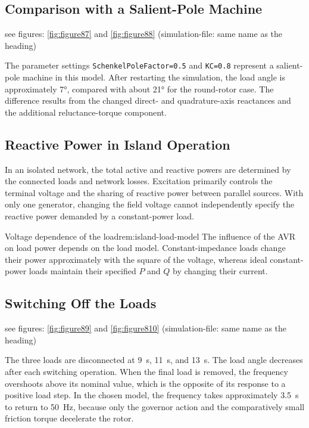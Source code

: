 \subsection{Comparison with a Salient-Pole Machine} see figures: \ref{fig:figure87} and \ref{fig:figure88}  (simulation-file: same name as the heading)

The parameter settings \texttt{SchenkelPoleFactor=0.5} and \texttt{KC=0.8}
represent a salient-pole machine in this model. After restarting the
simulation, the load angle is approximately \ang{7}, compared with about
\ang{21} for the round-rotor case. The difference results from the changed
direct- and quadrature-axis reactances and the additional reluctance-torque
component.



\subsection{Reactive Power in Island Operation} 

In an isolated network, the total active and reactive powers are determined by
the connected loads and network losses. Excitation primarily controls the
terminal voltage and the sharing of reactive power between parallel sources.
With only one generator, changing the field voltage cannot independently
specify the reactive power demanded by a constant-power load.

\begin{remark}{Voltage dependence of the load}{rem:island-load-model}
The influence of the AVR on load power depends on the load model. Constant-impedance loads change their power approximately with the square of the
voltage, whereas ideal constant-power loads maintain their specified $P$ and
$Q$ by changing their current.
\end{remark}

\subsection{Switching Off the Loads} see figures: \ref{fig:figure89} and \ref{fig:figure810}  (simulation-file: same name as the heading)

The three loads are disconnected at \SI{9}{\second}, \SI{11}{\second}, and
\SI{13}{\second}. The load angle decreases after each switching operation.
When the final load is removed, the frequency overshoots above its nominal
value, which is the opposite of its response to a positive load step. In the
chosen model, the frequency takes approximately \SI{3.5}{\second} to return
to \SI{50}{\hertz}, because only the governor action and the comparatively
small friction torque decelerate the rotor.

